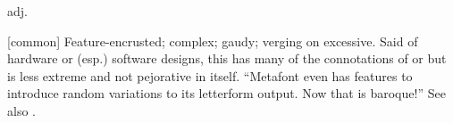  adj.

[common] Feature-encrusted; complex; gaudy; verging on excessive. Said of
hardware or (esp.) software designs, this has many of the connotations of
 or  but is less extreme and not
pejorative in itself. ``Metafont even has features to introduce random
variations to its letterform output. Now that is baroque!'' See also
.

